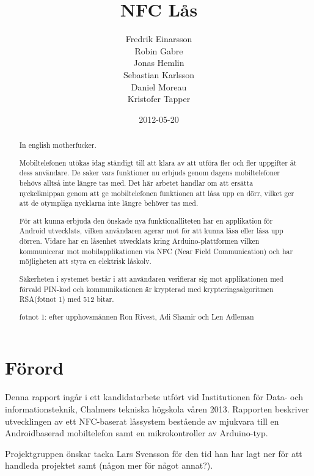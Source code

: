 \documentclass[11pt]{article}
\begin{document}
\title{NFC Lås}

\date{2012-05-20}

\author{Fredrik Einarsson\\
		Robin Gabre\\
		Jonas Hemlin\\
		Sebastian Karlsson\\
		Daniel Moreau\\ 
		Kristofer Tapper\\}

\maketitle
\newpage

\section*{Förord}
Denna rapport ingår i ett kandidatarbete utfört vid Institutionen för Data- och informationsteknik, Chalmers tekniska högskola våren 2013. Rapporten beskriver utvecklingen av ett NFC-baserat låssystem bestående av mjukvara till en Androidbaserad mobiltelefon samt en mikrokontroller av Arduino-typ. 

Projektgruppen önskar tacka Lars Svensson för den tid han har lagt ner för att handleda projektet samt (någon mer för något annat?).

\newpage

\renewcommand{\abstractname}{Abstract}
\begin{abstract}
In english motherfucker.
\end{abstract}
\newpage

\renewcommand{\abstractname}{Sammanfattning}
\begin{abstract}
Mobiltelefonen utökas idag ständigt till att klara av att utföra fler och fler uppgifter åt dess användare. De saker vars funktioner nu erbjuds genom dagens mobiltelefoner behövs alltså inte längre tas med. Det här arbetet handlar om att ersätta nyckelknippan genom att ge mobiltelefonen funktionen att låsa upp en dörr, vilket ger att de otympliga nycklarna inte längre behöver tas med.

För att kunna erbjuda den önskade nya funktionalliteten har en applikation för Android utvecklats, vilken användaren agerar mot för att kunna låsa eller låsa upp dörren. Vidare har en låsenhet utvecklats kring Arduino-plattformen vilken kommunicerar mot mobilapplikationen via NFC (Near Field Communication) och har möjligheten att styra en elektrisk låskolv.

Säkerheten i systemet består i att användaren verifierar sig mot applikationen med förvald PIN-kod och kommunikationen är krypterad med krypteringsalgoritmen RSA(fotnot 1) med 512 bitar.

fotnot 1: efter upphovsmännen Ron Rivest, Adi Shamir och Len Adleman
\end{abstract}
\newpage
\end{document}
